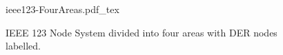 \documentclass[10pt,a4paper]{article}
\author{Aryan Ritwajeet Jha}
\begin{document}
	
\lipsum

\begin{figure}
	\centering
	{ieee123-FourAreas.pdf_tex}
	\caption{IEEE 123 Node System divided into four areas with DER nodes labelled.}
	\label{fig:ieee123-fourareas}
\end{figure}
\end{document}
